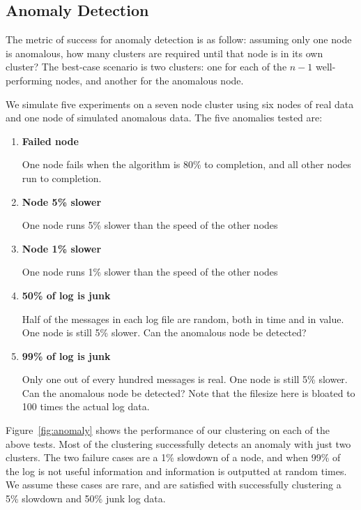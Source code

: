 \documentclass[conference]{style/acmsiggraph}
\begin{document}
\subsection{Anomaly Detection}
\label{subsec:results:anomaly}
The metric of success for anomaly detection is as follow: assuming only one node is anomalous, how many clusters are required until that node is in its own cluster?
The best-case scenario is two clusters: one for each of the $n-1$ well-performing nodes, and another for the anomalous node.

We simulate five experiments on a seven node cluster using six nodes of real data and one node of simulated anomalous data.
The five anomalies tested are:
\begin{enumerate}
\item
\textbf{Failed node}

One node fails when the algorithm is 80\% to completion, and all other nodes run to completion.
\item
\textbf{Node 5\% slower}

One node runs 5\% slower than the speed of the other nodes
\item
\textbf{Node 1\% slower}

One node runs 1\% slower than the speed of the other nodes
\item
\textbf{50\% of log is junk}

Half of the messages in each log file are random, both in time and in value. One node is still 5\% slower. Can the anomalous node be detected?
\item
\textbf{99\% of log is junk}

Only one out of every hundred messages is real. One node is still 5\% slower. Can the anomalous node be detected? Note that the filesize here is bloated to 100 times the actual log data.
\end{enumerate}

Figure~\ref{fig:anomaly} shows the performance of our clustering on each of the above tests.
Most of the clustering successfully detects an anomaly with just two clusters.
The two failure cases are a 1\% slowdown of a node, and when 99\% of the log is not useful information and information is outputted at random times.
We assume these cases are rare, and are satisfied with successfully clustering a 5\% slowdown and 50\% junk log data.
\end{document}
